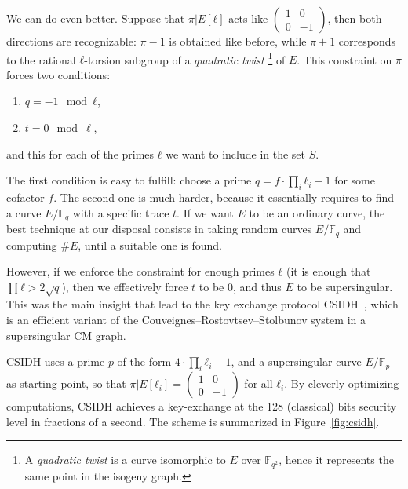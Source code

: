 \documentclass[10pt]{article}
\theoremstyle{plain}
\theoremstyle{definition}
\def\F{\ensuremath{\mathbb{F}}}
\def\mat#1{\left(\begin{smallmatrix}#1\end{smallmatrix}\right)}
\begin{document}
We can do even better. %
Suppose that $π|E[ℓ]$ acts like $\mat{1&0\\0&-1}$, then both
directions are recognizable: $π-1$ is obtained like before, while
$π+1$ corresponds to the rational $ℓ$-torsion subgroup of a
\emph{quadratic twist}%
\footnote{A \emph{quadratic twist} is a curve isomorphic to $E$ over
  $\F_{q^2}$, hence it represents the same point in the isogeny
  graph.} %
of $E$. %
This constraint on $π$ forces two conditions:
\begin{enumerate}
\item $q=-1 \mod ℓ$,
\item $t = 0 \mod\ell$,
\end{enumerate}
and this for each of the primes $ℓ$ we want to include in the set $S$.

The first condition is easy to fulfill: choose a prime
$q=f·\prod_i ℓ_i - 1$ for some cofactor $f$. %
The second one is much harder, because it essentially requires to find
a curve $E/\F_q$ with a specific trace $t$. %
If we want $E$ to be an ordinary curve, the best technique at our
disposal consists in taking random curves $E/\F_q$ and computing
$\#E$, until a suitable one is found. %

However, if we enforce the constraint for enough primes $ℓ$ (it is
enough that $\prod ℓ>2\sqrt{q}$), then we effectively force $t$ to be
$0$, and thus $E$ to be supersingular. %
This was the main insight that lead to the key exchange protocol
CSIDH~\cite{AC:CLMPR18}, which is an efficient variant of the
Couveignes--Rostovtsev--Stolbunov system in a supersingular CM
graph. %

CSIDH uses a prime $p$ of the form $4·\prod_iℓ_i-1$, and a
supersingular curve $E/\F_p$ as starting point, so that
$π|E[ℓ_i]=\mat{1&0\\0&-1}$ for all $ℓ_i$. %
By cleverly optimizing computations, CSIDH achieves a key-exchange at
the 128 (classical) bits security level in fractions of a second. %
The scheme is summarized in Figure~\ref{fig:csidh}.
\end{document}

